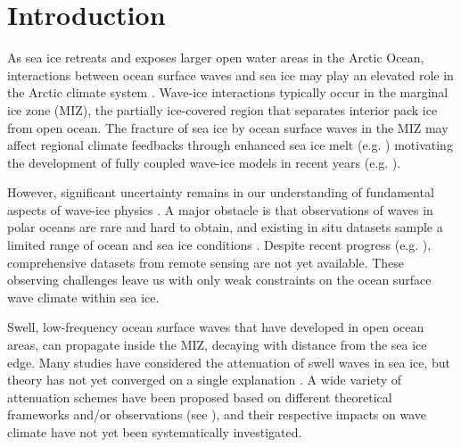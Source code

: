 \documentclass [11pt, proquest] {uwthesis}[2020/02/24]
\begin{document}
%
%

%
 
 
 
%
%

\textpages
 
 
\chapter {Introduction}
 
As sea ice retreats and exposes larger open water areas in the Arctic Ocean, interactions between ocean surface waves and sea ice may play an elevated role in the Arctic climate system \cite{Thomson2014SwellOcean}. Wave-ice interactions typically occur in the marginal ice zone (MIZ), the partially ice-covered region that separates interior pack ice from open ocean. The fracture of sea ice by ocean surface waves in the MIZ may affect regional climate feedbacks through enhanced sea ice melt (e.g. \cite{Asplin2012FractureStorms}) motivating the development of fully coupled wave-ice models in recent years (e.g. \cite{Roach2019, Boutin2020TowardsZone}).  

However, significant uncertainty remains in our understanding of fundamental aspects of wave-ice physics \cite{Shen2022waveice, Thomson2022WaveSystem}. A major obstacle is that observations of waves in polar oceans are rare and hard to obtain, and existing in situ datasets sample a limited range of ocean and sea ice conditions \cite{Collins2015InZone}. Despite recent progress (e.g. \cite{Brouwer2021}), comprehensive datasets from remote sensing are not yet available. These observing challenges leave us with only weak constraints on the ocean surface wave climate within sea ice.  

Swell, low-frequency ocean surface waves that have developed in open ocean areas, can propagate inside the MIZ, decaying with distance from the sea ice edge. Many studies have considered the attenuation of swell waves in sea ice, but theory has not yet converged on a single explanation \cite{Squire2020OceanReappraisal}. A wide variety of attenuation schemes have been proposed based on different theoretical frameworks and/or observations (see \cite{Perrie2022RepresentationsModels}), and their respective impacts on wave climate have not yet been systematically investigated.
\end{document}
